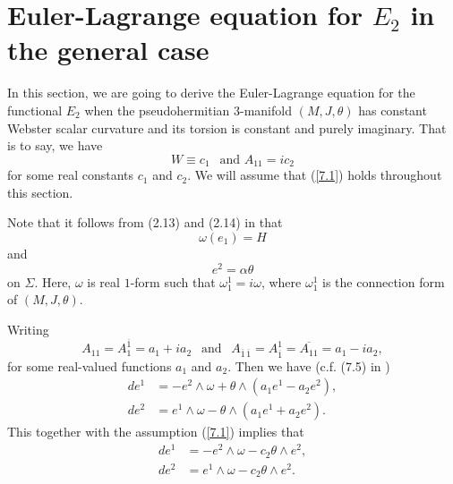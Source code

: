 \documentclass{amsart}
\theoremstyle{Corollary}
\numberwithin{equation}{section}
\begin{document}
\section{Euler-Lagrange equation for $E_2$ in the general case}\label{section6}
 

In this section, we are going to derive the Euler-Lagrange equation 
for the functional $E_2$ when the pseudohermitian $3$-manifold $(M,J,\theta)$
has constant Webster scalar curvature and 
its torsion is constant and purely imaginary. That is to say, we have 
\begin{equation}\label{7.1}
W\equiv c_1~~\mbox{ and }A_{11}=ic_2
\end{equation}
for some real constants $c_1$ and $c_2$. 
We will assume that (\ref{7.1}) holds
throughout this section. 





Note that it follows from (2.13) and (2.14) in \cite{CYZ}  that 
\begin{equation}\label{7.2}
\omega(e_1)=H
\end{equation}
and 
\begin{equation}\label{7.3}
e^2=\alpha\theta
\end{equation}
on $\Sigma$. Here, $\omega$ is real $1$-form such that 
$\omega_1^1=i\omega$, where $\omega_1^1$ is the connection form
of $(M,J,\theta)$.  


Writing 
\begin{equation}\label{7.4}
A_{11}=A_1^{\overline{1}}=a_1+ia_2~~
\mbox{ and }~~
A_{\overline{1}\,\overline{1}}=A_{\overline{1}}^1=\overline{A_{11}}=a_1-ia_2,
\end{equation}
for some real-valued functions $a_1$ and $a_2$. 
Then we have (c.f. (7.5) in \cite{CYZ})
\begin{equation}\label{7.6}
\begin{split}
de^1 &=-e^2\wedge\omega+\theta\wedge(a_1e^1-a_2e^2), \\
de^2 &=e^1\wedge\omega-\theta\wedge(a_1e^1+a_2e^2). 
\end{split}
\end{equation}
This together with the assumption (\ref{7.1}) implies that 
\begin{equation}\label{7.5}
\begin{split}
de^1 &=-e^2\wedge\omega-c_2\theta\wedge e^2, \\
de^2 &=e^1\wedge\omega-c_2\theta\wedge e^2. 
\end{split}
\end{equation}
\end{document}
